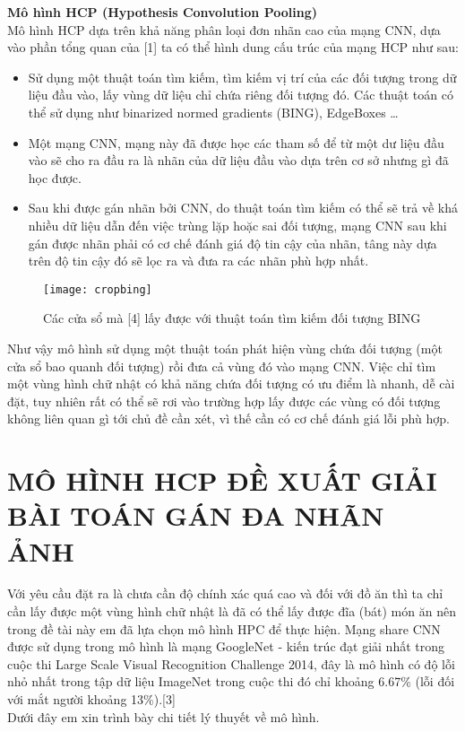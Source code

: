 \documentclass[13pt, a4paper]{extreport}
\begin{document}
\indent \textbf{Mô hình HCP (Hypothesis Convolution Pooling)}\\
\indent Mô hình HCP dựa trên khả năng phân loại đơn nhãn cao của mạng CNN, dựa vào phần tổng quan của [1] ta có thể hình dung cấu trúc của mạng HCP như sau:
\begin {itemize}
\item Sử dụng một thuật toán tìm kiếm, tìm kiếm vị trí của các đối tượng trong dữ liệu đầu vào, lấy vùng dữ liệu chỉ chứa riêng đối tượng đó. Các thuật toán có thể sử dụng như binarized normed gradients (BING), EdgeBoxes …
\item Một mạng CNN, mạng này đã được học các tham số để từ một dư liệu đầu vào sẽ cho ra đầu ra là nhãn của dữ liệu đầu vào dựa trên cơ sở nhưng gì đã học được.\\
\item Sau khi được gán nhãn bởi CNN, do thuật toán tìm kiếm có thể sẽ trả về khá nhiều dữ liệu dẫn đến việc trùng lặp hoặc sai đối tượng, mạng CNN sau khi gán được nhãn phải có cơ chế đánh giá độ tin cậy của nhãn, tâng này dựa trên độ tin cậy đó sẽ lọc ra và đưa ra các nhãn phù hợp nhất.
\end{itemize}
\begin{figure}[H]
  \centering
    \texttt{[image: cropbing]}
   \caption{\large Các cửa sổ mà [4] lấy được với thuật toán tìm kiếm đối tượng BING}
\end{figure}

\indent Như vậy mô hình sử dụng một thuật toán phát hiện vùng chứa đối tượng (một cửa sổ bao quanh đối tượng) rồi đưa cả vùng đó vào mạng CNN. Việc chỉ tìm một vùng hình chữ nhật có khả năng chứa đối tượng có ưu điểm là nhanh, dễ cài đặt, tuy nhiên rất có thể sẽ rơi vào trường hợp lấy được các vùng có đối tượng không liên quan gì tới chủ đề cần xét, vì thế cần có cơ chế đánh giá lỗi phù hợp.

\chapter{MÔ HÌNH HCP ĐỀ XUẤT GIẢI BÀI TOÁN \newline \hspace*{3.4cm} GÁN ĐA NHÃN ẢNH}
\indent Với yêu cầu đặt ra là chưa cần độ chính xác quá cao và đối với đồ ăn thì ta chỉ cần lấy được một vùng hình chữ nhật là đã có thể lấy được đĩa (bát) món ăn nên trong đề tài này em đã lựa chọn mô hình HPC để thực hiện. Mạng share CNN được sử dụng trong mô hình là mạng GoogleNet - kiến trúc đạt giải nhất trong cuộc thi Large Scale Visual Recognition Challenge 2014, đây là mô hình có độ lỗi nhỏ nhất trong tập dữ liệu ImageNet trong cuộc thi đó chỉ khoảng 6.67\% (lỗi đối với mắt người khoảng 13\%).[3]\\
\indent Dưới đây em xin trình bày chi tiết lý thuyết về mô hình.
\end{document}

